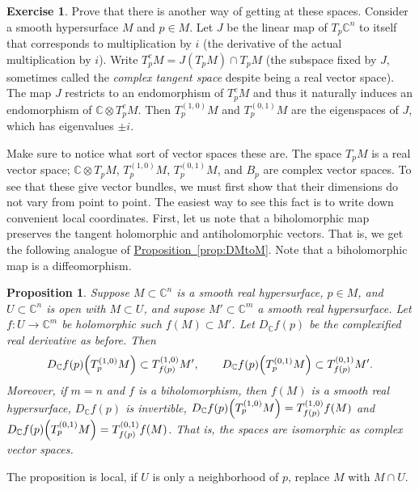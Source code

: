\documentclass[12pt,openany]{book}
\newcommand{\avoidbreak}{\postdisplaypenalty=100}
\newcommand{\C}{{\mathbb{C}}}
\newcommand{\myindex}[1]{#1\index{#1}}
\theoremstyle{plain}
\newtheorem{prop}[thm]{Proposition}
\theoremstyle{remark}
\theoremstyle{definition}
\newenvironment{exbox}{%
    \def\FrameCommand{\vrule width 1pt \relax\hspace{10pt}}%
    \MakeFramed{\advance\hsize-\width\FrameRestore}%
}{%
    \endMakeFramed
}
\theoremstyle{exercise}
\newtheorem{exercise}{Exercise}[section]
\theoremstyle{example}
\newcommand{\propref}[1]{\hyperref[#1]{Proposition~\ref*{#1}}}
\begin{document}
\begin{exbox}
\begin{exercise}
Prove that there is another way of getting at these spaces.  Consider a smooth
hypersurface $M$ and $p \in M$.  Let $J$ be the linear map of $T_p \C^n$ to
itself that corresponds to multiplication by $i$
(the derivative of the actual multiplication by $i$).
Write $T^c_p M = J(T_p M) \cap T_pM$ (the subspace fixed by $J$, sometimes
called the \emph{\myindex{complex tangent space}} despite being a real
vector space).
The map $J$ restricts to an endomorphism of $T^c_pM$ and thus it naturally induces
an endomorphism of $\C \otimes T^c_pM$.
Then $T^{(1,0)}_pM$ and
$T^{(0,1)}_pM$ are the eigenspaces of $J$, which has eigenvalues $\pm i$.
\end{exercise}
\end{exbox}

Make sure to notice what sort of vector spaces these are.
The space $T_pM$ is a real vector space;
$\C \otimes T_pM$, $T_p^{(1,0)}M$, $T_p^{(0,1)} M$, and $B_p$
are complex vector spaces.
To see that these give vector bundles,
we must first show that their dimensions do not vary
from point to point.  The easiest way to see this fact is to write down
convenient local coordinates.  First, let us note that
a biholomorphic map preserves the tangent holomorphic and antiholomorphic
vectors.  That is, we get the following
analogue of \propref{prop:DMtoM}.
Note that a biholomorphic map is a diffeomorphism.

\begin{prop} \label{prop:whereTgoeshol}
Suppose $M \subset \C^n$ is a smooth real hypersurface, $p \in M$,
and $U \subset \C^n$ is open with $M \subset U$, and supose $M' \subset
\C^m$ a smooth real hypersurface.
Let $f \colon U \to \C^m$ be holomorphic such $f(M) \subset M'$.
Let $D_\C f(p)$ be
the complexified real derivative as before.  Then
\begin{equation*}
D_\C f(p)\Bigl(T_p^{(1,0)}M\Bigr) \subset T_{f(p)}^{(1,0)}M', \qquad
D_\C f(p)\Bigl(T_p^{(0,1)}M\Bigr) \subset T_{f(p)}^{(0,1)}M'.
\avoidbreak
\end{equation*}
Moreover, if $m=n$ and $f$ is a biholomorphism,
then $f(M)$ is a smooth real hypersurface,
$D_\C f(p)$ is invertible,
$D_\C f(p)\Bigl(T_p^{(1,0)}M\Bigr) = T_{f(p)}^{(1,0)} f(M)$
and
$D_\C f(p)\Bigl(T_p^{(0,1)}M\Bigr) = T_{f(p)}^{(0,1)} f(M)$.
That is, the spaces are isomorphic as complex vector spaces.
\end{prop}

The proposition is local, if $U$ is only a neighborhood of $p$,
replace $M$ with $M \cap U$.
\end{document}
